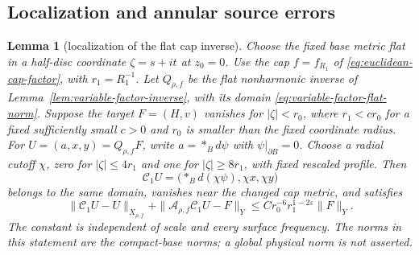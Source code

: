 \documentclass[11pt]{amsart}
\newtheorem{lemma}[theorem]{Lemma}
\theoremstyle{definition}
\theoremstyle{remark}
\theoremstyle{plain}
\begin{document}
\subsection{Localization and annular source errors}
\begin{lemma}[localization of the flat cap inverse]
\label{lem:flat-cap-localization}
Choose the fixed base metric flat in a half-disc coordinate
$\zeta=s+it$ at $z_0=0$. Use the cap $f=f_{R_1}$ of
\eqref{eq:euclidean-cap-factor}, with $r_1=R_1^{-1}$.
Let $Q_{\rho,f}$ be the flat nonharmonic inverse of
Lemma~\ref{lem:variable-factor-inverse}, with its domain
\eqref{eq:variable-factor-flat-norm}. Suppose the target
$F=(H,v)$ vanishes for $|\zeta|<r_0$, where
$r_1<c r_0$ for a fixed sufficiently small $c>0$ and $r_0$
is smaller than the fixed coordinate radius.
For $U=(a,x,y)=Q_{\rho,f}F$, write
$a=*_B d\psi$ with $\psi|_{\partial B}=0$.
Choose a radial cutoff $\chi$, zero for $|\zeta|\leq4r_1$
and one for $|\zeta|\geq8r_1$, with fixed rescaled profile.
Then
\begin{equation}\label{eq:stream-cutoff}
 \mathcal C_1U=\bigl(*_B d(\chi\psi),\chi x,\chi y\bigr)
\end{equation}
belongs to the same domain, vanishes near the changed cap metric,
and satisfies
\begin{equation}\label{eq:flat-cap-localization}
 \|\mathcal C_1U-U\|_{X_{\rho,f}}
 +\|\mathcal A_{\rho,f}\mathcal C_1U-F\|_Y
 \leq C r_0^{-6}r_1^{1-2\varepsilon}\|F\|_Y .
\end{equation}
The constant is independent of scale and every surface frequency.
The norms in this statement are the compact-base norms; a global
physical norm is not asserted.
\end{lemma}
\end{document}

